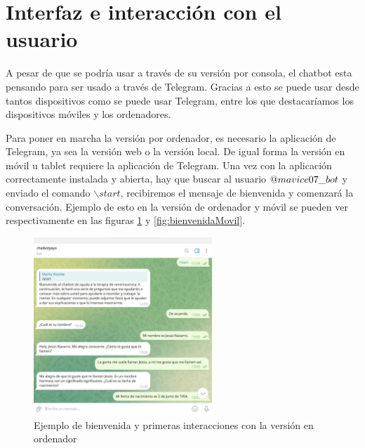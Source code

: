 \section{Interfaz e interacción con el usuario}
A pesar de que se podría usar a través de su versión por consola, el chatbot esta pensando para ser usado a través de Telegram. Gracias a esto se puede usar desde tantos dispositivos como se puede usar Telegram, entre los que destacaríamos los dispositivos móviles y los ordenadores.

Para poner en marcha la versión por ordenador, es necesario la aplicación de Telegram, ya sea la versión web o la versión local. De igual forma la versión en móvil u tablet requiere la aplicación de Telegram. Una vez con la aplicación correctamente instalada y abierta, hay que buscar al usuario $\makeatletter @ mavice07\_bot$ y enviado el comando  $\backslash start$, recibiremos el mensaje de bienvenida y comenzará la conversación. Ejemplo de esto en la versión de ordenador y móvil se pueden ver respectivamente en las figuras \ref{fig:bienvenidaOrdenador} y \ref{fig:bienvenidaMovil}.

\begin{figure}[h]
	\centering
	\includegraphics[width=0.6\textwidth]{Imagenes/bienvenidaOrdenador}
	\caption{Ejemplo de bienvenida y primeras interacciones con la versión en ordenador}
	\label{fig:bienvenidaOrdenador}
\end{figure}

